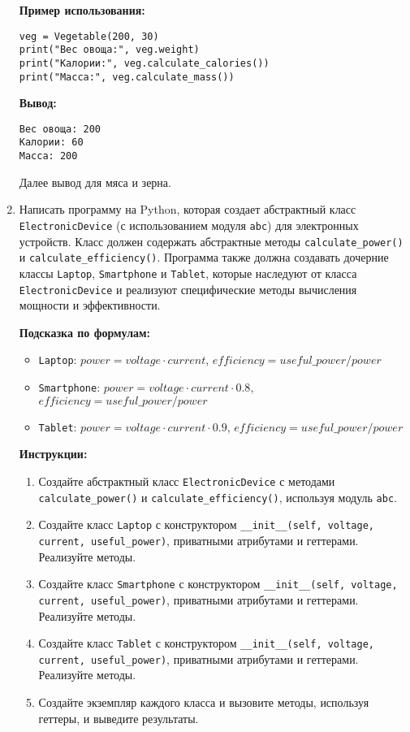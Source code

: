 \begin{enumerate}
\textbf{Пример использования:}
\begin{verbatim}
veg = Vegetable(200, 30)
print("Вес овоща:", veg.weight)
print("Калории:", veg.calculate_calories())
print("Масса:", veg.calculate_mass())
\end{verbatim}

\textbf{Вывод:}
\begin{verbatim}
Вес овоща: 200
Калории: 60
Масса: 200
\end{verbatim}

Далее вывод для мяса и зерна.

\item
Написать программу на Python, которая создает абстрактный класс \texttt{ElectronicDevice} (с использованием модуля \texttt{abc}) для электронных устройств. 
Класс должен содержать абстрактные методы \texttt{calculate\_power()} и \texttt{calculate\_efficiency()}. 
Программа также должна создавать дочерние классы \texttt{Laptop}, \texttt{Smartphone} и \texttt{Tablet}, 
которые наследуют от класса \texttt{ElectronicDevice} и реализуют специфические методы вычисления мощности и эффективности.

\textbf{Подсказка по формулам:}
\begin{itemize}
    \item \texttt{Laptop}: $power = voltage \cdot current$, $efficiency = useful\_power / power$
    \item \texttt{Smartphone}: $power = voltage \cdot current \cdot 0.8$, $efficiency = useful\_power / power$
    \item \texttt{Tablet}: $power = voltage \cdot current \cdot 0.9$, $efficiency = useful\_power / power$
\end{itemize}

\textbf{Инструкции:}
\begin{enumerate}
    \item Создайте абстрактный класс \texttt{ElectronicDevice} с методами \texttt{calculate\_power()} и \texttt{calculate\_efficiency()}, используя модуль \texttt{abc}.
    \item Создайте класс \texttt{Laptop} с конструктором \texttt{\_\_init\_\_(self, voltage, current, useful\_power)}, приватными атрибутами и геттерами. Реализуйте методы.
    \item Создайте класс \texttt{Smartphone} с конструктором \texttt{\_\_init\_\_(self, voltage, current, useful\_power)}, приватными атрибутами и геттерами. Реализуйте методы.
    \item Создайте класс \texttt{Tablet} с конструктором \texttt{\_\_init\_\_(self, voltage, current, useful\_power)}, приватными атрибутами и геттерами. Реализуйте методы.
    \item Создайте экземпляр каждого класса и вызовите методы, используя геттеры, и выведите результаты.
\end{enumerate}


\end{enumerate}
